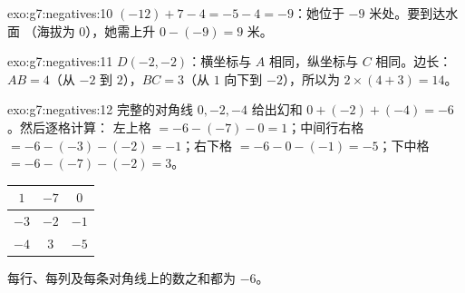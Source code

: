 \begin{solution}{exo:g7:negatives:10}
$(-12) + 7 - 4 = -5 - 4 = -9$：她位于 $-9$ 米处。要到达水面
（海拔为 $0$），她需上升 $0 - (-9) = 9$ 米。
\end{solution}

\begin{solution}{exo:g7:negatives:11}
$D(-2, -2)$：横坐标与 $A$ 相同，纵坐标与
$C$ 相同。边长：$AB = 4$（从 $-2$ 到 $2$），$BC = 3$（从 $1$ 向下到
$-2$），所以为 $2 \times (4 + 3) = 14$。
\end{solution}

\begin{solution}{exo:g7:negatives:12}
完整的对角线 $0, -2, -4$ 给出幻和
$0 + (-2) + (-4) = -6$。然后逐格计算：
左上格 $= -6 - (-7) - 0 = 1$；中间行右格 $= -6 - (-3) - (-2) =
-1$；右下格 $= -6 - 0 - (-1) = -5$；下中格
$= -6 - (-7) - (-2) = 3$。
\begin{center}
\renewcommand{\arraystretch}{1.4}
\begin{tabular}{|c|c|c|}
\hline
$1$ & $-7$ & $0$ \\
\hline
$-3$ & $-2$ & $-1$ \\
\hline
$-4$ & $3$ & $-5$ \\
\hline
\end{tabular}
\end{center}
每行、每列及每条对角线上的数之和都为 $-6$。
\end{solution}

